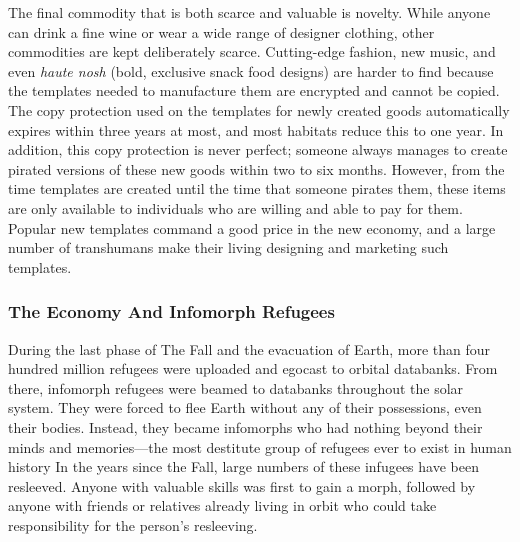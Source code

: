 The final commodity that is both scarce and valuable
is novelty. While anyone can drink a fine wine
or wear a wide range of designer clothing, other 
commodities are kept deliberately scarce. Cutting-edge
fashion, new music, and even \textit{haute nosh }(bold,
exclusive snack food designs) are harder to find because
the templates needed to manufacture them are
encrypted and cannot be copied. The copy protection 
used on the templates for newly created goods automatically
expires within three years at most, and most
habitats reduce this to one year. In addition, this copy 
protection is never perfect; someone always manages 
to create pirated versions of these new goods within 
two to six months. However, from the time templates 
are created until the time that someone pirates them, 
these items are only available to individuals who are 
willing and able to pay for them. Popular new templates
command a good price in the new economy,
and a large number of transhumans make their living 
designing and marketing such templates.

\subsubsection{The Economy And Infomorph Refugees}

During the last phase of The Fall and the evacuation 
of Earth, more than four hundred million refugees 
were uploaded and egocast to orbital databanks. From 
there, infomorph refugees were beamed to databanks 
throughout the solar system. They were forced to flee 
Earth without any of their possessions, even their 
bodies. Instead, they became infomorphs who had 
nothing beyond their minds and memories—the most 
destitute group of refugees ever to exist in human history
In the years since the Fall, large numbers of these
infugees have been resleeved. Anyone with valuable 
skills was first to gain a morph, followed by anyone 
with friends or relatives already living in orbit who 
could take responsibility for the person's resleeving.

